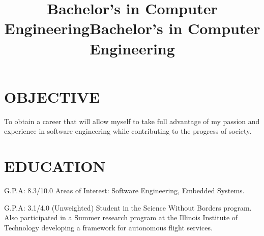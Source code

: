 \documentclass[margin, 10pt]{res} %
\begin{document}
\address{guilherme\_abinader@hotmail.com}
\address{github.com/guilhermesimas}
\address{+55 (21) 99424 6137}


\begin{resume}

 
\section{OBJECTIVE}  

To obtain a career that will allow myself to take full advantage of my passion and experience in software engineering while contributing to the progress of society. 


\section{EDUCATION}
\title{Bachelor's in Computer Engineering}
\begin{position}
	G.P.A: 8.3/10.0 Areas of Interest: Software Engineering, Embedded Systems.
\end{position}
\title{Bachelor's in Computer Engineering}
\begin{position}
	G.P.A: 3.1/4.0 (Unweighted) Student in the Science Without Borders program. Also participated in a Summer research program at the Illinois Institute of Technology developing a framework for autonomous flight services.
\end{position}



\end{resume}
\end{document}

